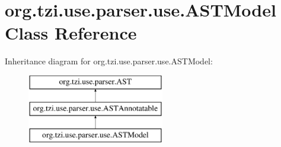 \hypertarget{classorg_1_1tzi_1_1use_1_1parser_1_1use_1_1_a_s_t_model}{\section{org.\-tzi.\-use.\-parser.\-use.\-A\-S\-T\-Model Class Reference}
\label{classorg_1_1tzi_1_1use_1_1parser_1_1use_1_1_a_s_t_model}
}
Inheritance diagram for org.\-tzi.\-use.\-parser.\-use.\-A\-S\-T\-Model\-:\begin{figure}[H]
\begin{center}
\leavevmode
\includegraphics[height=3.000000cm]{classorg_1_1tzi_1_1use_1_1parser_1_1use_1_1_a_s_t_model}
\end{center}
\end{figure}
